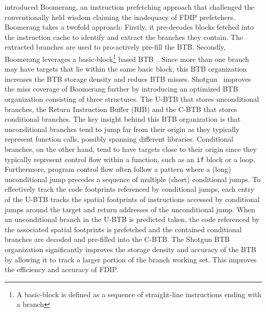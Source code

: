 \documentclass[../main.tex]{subfiles}
\begin{document}
\begin{refsection}
\textcite{kumar17_boomer} introduced Boomerang, an instruction
prefetching approach that challenged the conventionally held wisdom
claiming the inadequacy of FDIP prefetchers. Boomerang takes a twofold
approach: Firstly, it pre-decodes blocks fetched into the instruction
cache to identify and extract the branches they contain. The extracted
branches are used to pro-actively pre-fill the BTB. Secondly,
Boomerang leverages a basic-block\footnote{A basic-block is defined as
  a sequence of straight-line instructions ending with a branch} based
BTB~\cite{yeh92_compr_instr_fetch_mechan_for}. Since more than one
branch may have targets that lie within the same basic block, this BTB
organization increases the BTB storage density and redues BTB
misses. Shotgun~\cite{kumar18_blast_throug_front_end_bottl_with_shotg,kumar20_shoot_down_server_front_end_bottl}
improves the miss coverage of Boomerang further by introducing an
optimized BTB organization consisting of three structures. The U-BTB
that stores unconditional branches, the Return Instruction Buffer
(RIB) and the C-BTB that stores conditional branches. The key insight
behind this BTB organization is that unconditional branches tend to
jump far from their origin as they typically represent function calls,
possibly spanning different libraries. Conditional branches, on the
other hand, tend to have targets close to their origin since they
typically represent control flow within a function, such as an
\texttt{if} block or a loop. Furthermore, program control flow often
follow a pattern where a (long) unconditional jump precedes a sequence
of multiple (short) conditional jumps. To effectively track the code
footprints referenced by conditional jumps, each entry of the U-BTB
tracks the spatial footprints of instructions accessed by conditional
jumps around the target and return addresses of the unconditional
jump. When an unconditional branch in the U-BTB is predicted taken,
the code referenced by the associated spatial footprints is prefetched
and the contained conditional branches are decoded and pre-filled into
the C-BTB. The Shotgun BTB organization significantly improves the
storage density and accuracy of the BTB by allowing it to track a
larger portion of the branch working set. This improves the efficiency
and accuracy of FDIP.


\end{refsection}
\end{document}
